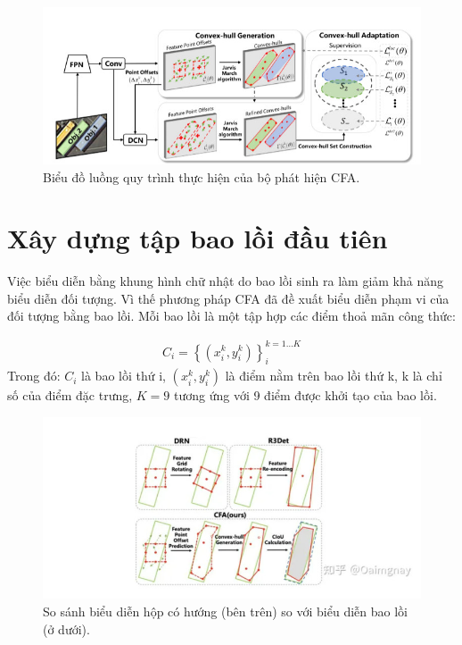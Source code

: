 \documentclass[12pt,a4paper,openany,oneside]{report}
\begin{document}
\begin{figure}[ht!]
	\begin{center}
		\includegraphics[width=450px]{./work_flow_cfa.JPG}
		\caption{Biểu đồ luồng quy trình thực hiện của bộ phát hiện CFA.}
		\label{work_flow_cfa}
	\end{center}
\end{figure} 

\section{Xây dựng tập bao lồi đầu tiên}
Việc biểu diễn bằng khung hình chữ nhật do bao lồi sinh ra làm giảm khả năng biểu diễn đối tượng. Vì thế phương pháp CFA đã đề xuất biểu diễn phạm vi của đối tượng bằng bao lồi. Mỗi bao lồi là một tập hợp các điểm thoả mãn công thức:

\begin{align} \label{convex_hull_definition}
		C_i=\left\{\left(x_i^k, y_i^k\right)\right\}_i^{k=1 \ldots K}
\end{align}
Trong đó: $C_i$ là bao lồi thứ i, $\left(x_i^k, y_i^k\right)$ là điểm nằm trên bao lồi thứ k, k là chỉ số của điểm đặc trưng, $K = 9$ tương ứng với 9 điểm được khởi tạo của bao lồi.

\begin{figure}[ht!]
	\begin{center}
		\includegraphics[width=445px]{./compare_convex-hull_with_rectangle.jpg}
		\caption{So sánh biểu diễn hộp có hướng (bên trên) so với biểu diễn bao lồi (ở dưới).}
	\end{center}
\end{figure} 
\end{document}
